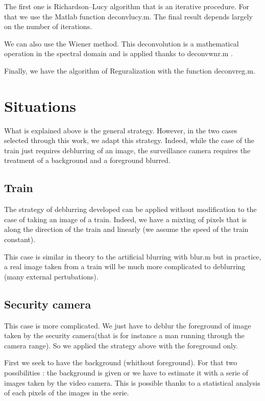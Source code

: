 The first one is Richardson–Lucy algorithm that is an iterative procedure. For that we use the Matlab function deconvlucy.m. The final result depends largely on the number of iterations.

We can also use the Wiener method. This deconvolution is a mathematical operation in the spectral domain and is applied thanks to deconvwnr.m .

Finally, we have the algorithm of Reguralization with the function deconvreg.m.

\section{Situations}

What is explained above is the general strategy. However, in the two cases selected through this work, we adapt this strategy. 
Indeed, while the case of the train just requires deblurring of an image, the surveillance camera requires the treatment of a background and a foreground blurred.

\subsection{Train}
 
The strategy of deblurring developed can be applied without modification to the case of taking an image of a train. Indeed, we have a mixting of pixels that is along the direction of the train and linearly (we assume the speed of the train constant). 

This case is similar in theory to the artificial blurring with blur.m but in practice, a real image taken from a train will be much more complicated to deblurring (many external pertubations). 

\subsection{Security camera}

This case is more complicated. We just have to deblur the foreground of image taken by the security camera(that is for instance a man running through the camera range). So we applied the strategy above with the foreground only.

First we seek to have the background (whithout foreground). For that two possibilities : the background is given or we have to estimate it with a serie of images taken by the video camera. This is possible thanks to a statistical analysis of each pixels of the images in the serie.

